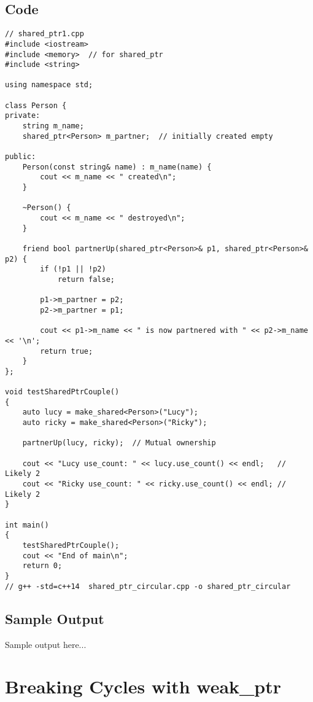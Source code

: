 \documentclass[12pt]{article}
\begin{document}
\subsection*{Code}
\begin{Verbatim}[fontsize=\small,frame=single]
// shared_ptr1.cpp
#include <iostream>
#include <memory>  // for shared_ptr
#include <string>

using namespace std;

class Person {
private:
    string m_name;
    shared_ptr<Person> m_partner;  // initially created empty

public:
    Person(const string& name) : m_name(name) {
        cout << m_name << " created\n";
    }

    ~Person() {
        cout << m_name << " destroyed\n";
    }

    friend bool partnerUp(shared_ptr<Person>& p1, shared_ptr<Person>& p2) {
        if (!p1 || !p2)
            return false;

        p1->m_partner = p2;
        p2->m_partner = p1;

        cout << p1->m_name << " is now partnered with " << p2->m_name << '\n';
        return true;
    }
};

void testSharedPtrCouple()
{
    auto lucy = make_shared<Person>("Lucy");
    auto ricky = make_shared<Person>("Ricky");

    partnerUp(lucy, ricky);  // Mutual ownership

    cout << "Lucy use_count: " << lucy.use_count() << endl;   // Likely 2
    cout << "Ricky use_count: " << ricky.use_count() << endl; // Likely 2
}

int main()
{
    testSharedPtrCouple();
    cout << "End of main\n";
    return 0;
}
// g++ -std=c++14  shared_ptr_circular.cpp -o shared_ptr_circular
\end{Verbatim}

\subsection*{Sample Output}
\begin{tcolorbox}[colback=black!5!white,colframe=black!75!white]
Sample output here...
\end{tcolorbox}
\newpage

\section*{Breaking Cycles with weak_ptr}
\end{document}
